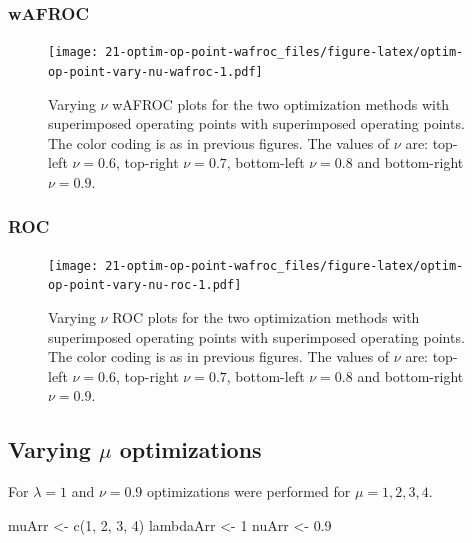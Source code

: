 \documentclass[
]{book}
\newenvironment{Shaded}{\begin{snugshade}}{\end{snugshade}}
\newcommand{\DecValTok}[1]{\textcolor[rgb]{0.00,0.00,0.81}{#1}}
\newcommand{\FloatTok}[1]{\textcolor[rgb]{0.00,0.00,0.81}{#1}}
\newcommand{\FunctionTok}[1]{\textcolor[rgb]{0.00,0.00,0.00}{#1}}
\newcommand{\NormalTok}[1]{#1}
\newcommand{\OtherTok}[1]{\textcolor[rgb]{0.56,0.35,0.01}{#1}}
\begin{document}
\hypertarget{wafroc-3}{%
\subsubsection{wAFROC}\label{wafroc-3}}

\begin{figure}
\centering
\texttt{[image: 21-optim-op-point-wafroc\_files/figure-latex/optim-op-point-vary-nu-wafroc-1.pdf]}
\caption{\label{fig:optim-op-point-vary-nu-wafroc}Varying \(\nu\) wAFROC plots for the two optimization methods with superimposed operating points with superimposed operating points. The color coding is as in previous figures. The values of \(\nu\) are: top-left \(\nu = 0.6\), top-right \(\nu = 0.7\), bottom-left \(\nu = 0.8\) and bottom-right \(\nu = 0.9\).}
\end{figure}

\hypertarget{roc-3}{%
\subsubsection{ROC}\label{roc-3}}

\begin{figure}
\centering
\texttt{[image: 21-optim-op-point-wafroc\_files/figure-latex/optim-op-point-vary-nu-roc-1.pdf]}
\caption{\label{fig:optim-op-point-vary-nu-roc}Varying \(\nu\) ROC plots for the two optimization methods with superimposed operating points with superimposed operating points. The color coding is as in previous figures. The values of \(\nu\) are: top-left \(\nu = 0.6\), top-right \(\nu = 0.7\), bottom-left \(\nu = 0.8\) and bottom-right \(\nu = 0.9\).}
\end{figure}

\hypertarget{optim-op-point-vary-mu}{%
\subsection{\texorpdfstring{Varying \(\mu\) optimizations}{Varying \textbackslash mu optimizations}}\label{optim-op-point-vary-mu}}

For \(\lambda = 1\) and \(\nu = 0.9\) optimizations were performed for \(\mu = 1, 2, 3, 4\).

\begin{Shaded}
\begin{Highlighting}[]
\NormalTok{muArr }\OtherTok{\textless{}{-}} \FunctionTok{c}\NormalTok{(}\DecValTok{1}\NormalTok{, }\DecValTok{2}\NormalTok{, }\DecValTok{3}\NormalTok{, }\DecValTok{4}\NormalTok{)}
\NormalTok{lambdaArr }\OtherTok{\textless{}{-}} \DecValTok{1}
\NormalTok{nuArr }\OtherTok{\textless{}{-}} \FloatTok{0.9}
\end{Highlighting}
\end{Shaded}
\end{document}
